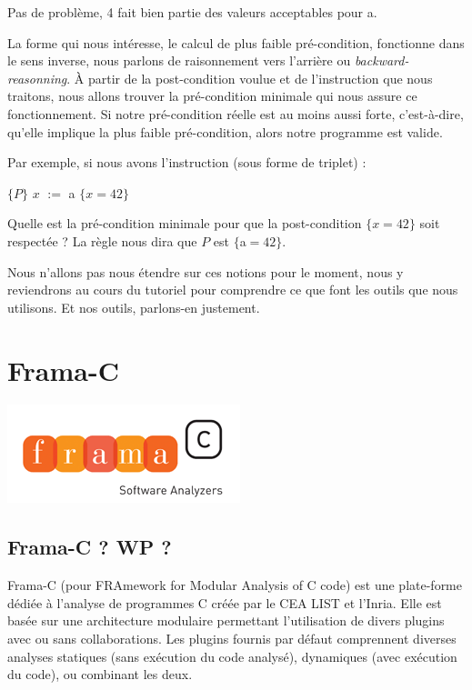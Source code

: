 \documentclass[12pt,francais,]{scrbook}
\begin{document}
Pas de problème, 4 fait bien partie des valeurs acceptables pour a.

La forme qui nous intéresse, le calcul de plus faible pré-condition,
fonctionne dans le sens inverse, nous parlons de \og{}raisonnement vers
l'arrière\fg{} ou \emph{backward-reasonning}. À partir de la post-condition
voulue et de l'instruction que nous traitons, nous allons trouver la
pré-condition minimale qui nous assure ce fonctionnement. Si notre
pré-condition réelle est au moins aussi forte, c'est-à-dire, qu'elle
implique la plus faible pré-condition, alors notre programme est valide.

Par exemple, si nous avons l'instruction (sous forme de triplet) :

\(\{P\}\) \(x\) \(:=\) a \(\{x = 42\}\)

Quelle est la pré-condition minimale pour que la post-condition
\(\{x = 42\}\) soit respectée ? La règle nous dira que \(P\) est
\(\{\)a\(=42\}\).

Nous n'allons pas nous étendre sur ces notions pour le moment, nous y
reviendrons au cours du tutoriel pour comprendre ce que font les outils
que nous utilisons. Et nos outils, parlons-en justement.

\section{Frama-C}\label{frama-c}

\begin{center}\includegraphics[scale=0.5]{framac.png}\end{center}

\subsection{Frama-C ? WP ?}\label{frama-c-wp}

Frama-C (pour FRAmework for Modular Analysis of C code) est une
plate-forme dédiée à l'analyse de programmes C créée par le CEA LIST et
l'Inria. Elle est basée sur une architecture modulaire permettant
l'utilisation de divers plugins avec ou sans collaborations. Les plugins
fournis par défaut comprennent diverses analyses statiques (sans
exécution du code analysé), dynamiques (avec exécution du code), ou
combinant les deux.
\end{document}
